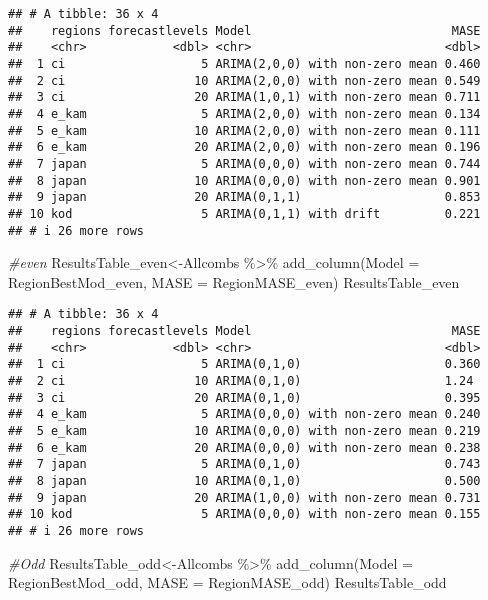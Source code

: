 \documentclass[
]{article}
\newenvironment{Shaded}{\begin{snugshade}}{\end{snugshade}}
\newcommand{\AttributeTok}[1]{\textcolor[rgb]{0.77,0.63,0.00}{#1}}
\newcommand{\CommentTok}[1]{\textcolor[rgb]{0.56,0.35,0.01}{\textit{#1}}}
\newcommand{\FunctionTok}[1]{\textcolor[rgb]{0.00,0.00,0.00}{#1}}
\newcommand{\NormalTok}[1]{#1}
\newcommand{\OtherTok}[1]{\textcolor[rgb]{0.56,0.35,0.01}{#1}}
\newcommand{\SpecialCharTok}[1]{\textcolor[rgb]{0.00,0.00,0.00}{#1}}
\begin{document}
\begin{verbatim}
## # A tibble: 36 x 4
##    regions forecastlevels Model                            MASE
##    <chr>            <dbl> <chr>                           <dbl>
##  1 ci                   5 ARIMA(2,0,0) with non-zero mean 0.460
##  2 ci                  10 ARIMA(2,0,0) with non-zero mean 0.549
##  3 ci                  20 ARIMA(1,0,1) with non-zero mean 0.711
##  4 e_kam                5 ARIMA(2,0,0) with non-zero mean 0.134
##  5 e_kam               10 ARIMA(2,0,0) with non-zero mean 0.111
##  6 e_kam               20 ARIMA(2,0,0) with non-zero mean 0.196
##  7 japan                5 ARIMA(0,0,0) with non-zero mean 0.744
##  8 japan               10 ARIMA(0,0,0) with non-zero mean 0.901
##  9 japan               20 ARIMA(0,1,1)                    0.853
## 10 kod                  5 ARIMA(0,1,1) with drift         0.221
## # i 26 more rows
\end{verbatim}

\begin{Shaded}
\begin{Highlighting}[]
\CommentTok{\#even}
\NormalTok{ResultsTable\_even}\OtherTok{\textless{}{-}}\NormalTok{Allcombs }\SpecialCharTok{\%\textgreater{}\%} \FunctionTok{add\_column}\NormalTok{(}\AttributeTok{Model =}\NormalTok{ RegionBestMod\_even, }\AttributeTok{MASE =}\NormalTok{ RegionMASE\_even)}
\NormalTok{ResultsTable\_even}
\end{Highlighting}
\end{Shaded}

\begin{verbatim}
## # A tibble: 36 x 4
##    regions forecastlevels Model                            MASE
##    <chr>            <dbl> <chr>                           <dbl>
##  1 ci                   5 ARIMA(0,1,0)                    0.360
##  2 ci                  10 ARIMA(0,1,0)                    1.24 
##  3 ci                  20 ARIMA(0,1,0)                    0.395
##  4 e_kam                5 ARIMA(0,0,0) with non-zero mean 0.240
##  5 e_kam               10 ARIMA(0,0,0) with non-zero mean 0.219
##  6 e_kam               20 ARIMA(0,0,0) with non-zero mean 0.238
##  7 japan                5 ARIMA(0,1,0)                    0.743
##  8 japan               10 ARIMA(0,1,0)                    0.500
##  9 japan               20 ARIMA(1,0,0) with non-zero mean 0.731
## 10 kod                  5 ARIMA(0,0,0) with non-zero mean 0.155
## # i 26 more rows
\end{verbatim}

\begin{Shaded}
\begin{Highlighting}[]
\CommentTok{\#Odd}
\NormalTok{ResultsTable\_odd}\OtherTok{\textless{}{-}}\NormalTok{Allcombs }\SpecialCharTok{\%\textgreater{}\%} \FunctionTok{add\_column}\NormalTok{(}\AttributeTok{Model =}\NormalTok{ RegionBestMod\_odd, }\AttributeTok{MASE =}\NormalTok{ RegionMASE\_odd)}
\NormalTok{ResultsTable\_odd}
\end{Highlighting}
\end{Shaded}
\end{document}
